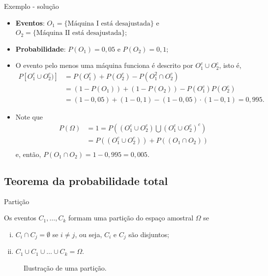 \documentclass[9pt]{beamer}
\begin{document}
\begin{frame}{Exemplo - solução}
	\begin{itemize}
		\item \textbf{Eventos}: $O_1=\{\mbox{Máquina I está desajustada}\}$ e $O_2=\{\mbox{Máquina II está desajustada}\}$;
		\item \textbf{Probabilidade}: $P(O_1) = 0,05$ e $P(O_2) = 0,1$;
		\item O evento pelo menos uma máquina funciona é descrito por $O_1^c \cup O_2^c$, isto é,
		\begin{align*}
		P[O_1^c \cup O_2^c)] &= P(O_1^c ) + P (O_2^c) - P (O_1^2 \cap O_2^c) \\
		&= (1-P(O_1))  + (1-P( O_2)) - P(O_1^c) P(O_2^c) \\
		&=(1-0,05)  + (1-0,1) - (1-0,05) \cdot (1-0,1) = 0,995.
		\end{align*}
		\item Note que
		\begin{align*}
		P(\Omega) &= 1 =  P\left(\left( O_1^c \cup O_2^c \right)\bigcup \left(O_1^c \cup O_2^c\right)^c\right)\\
		&= P\left(\left( O_1^c \cup O_2^c \right)\right) + P\left(\left( O_1 \cap O_2 \right)\right)\\
		\end{align*}
		e, então, $P(O_1 \cap O_2) = 1 - 0,995 = 0,005$.
	\end{itemize}	
\end{frame}

\subsection{Teorema da probabilidade total}

\begin{frame}{Partição}


		Os eventos $C_1, \dots, C_k$ formam uma partição do espaço amostral $\Omega$ se 
		\begin{enumerate}[i.]
			\item $C_i \cap C_j= \emptyset$ se $i \neq j$, ou seja, $C_i$ e $C_j$ são disjuntos;
			\item $C_1 \cup C_1 \cup \dots \cup C_k  =  \Omega$.
		\end{enumerate}
		
	 \begin{figure}[htbp]
	 \caption{Ilustração de uma partição.}
	 \end{figure}
\end{frame}
\end{document}
